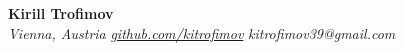 \documentclass[12pt, a4paper]{article}
\begin{document}
\begin{center}
    {\Huge \textbf{Kirill Trofimov}} \\[0.3em]
    {\small 
        \textit{Vienna, Austria} \quad
        \textit{\href{https://github.com/kitrofimov}{github.com/kitrofimov}} \quad
        \textit{kitrofimov39@gmail.com}
    }
\end{center}





\end{document}
